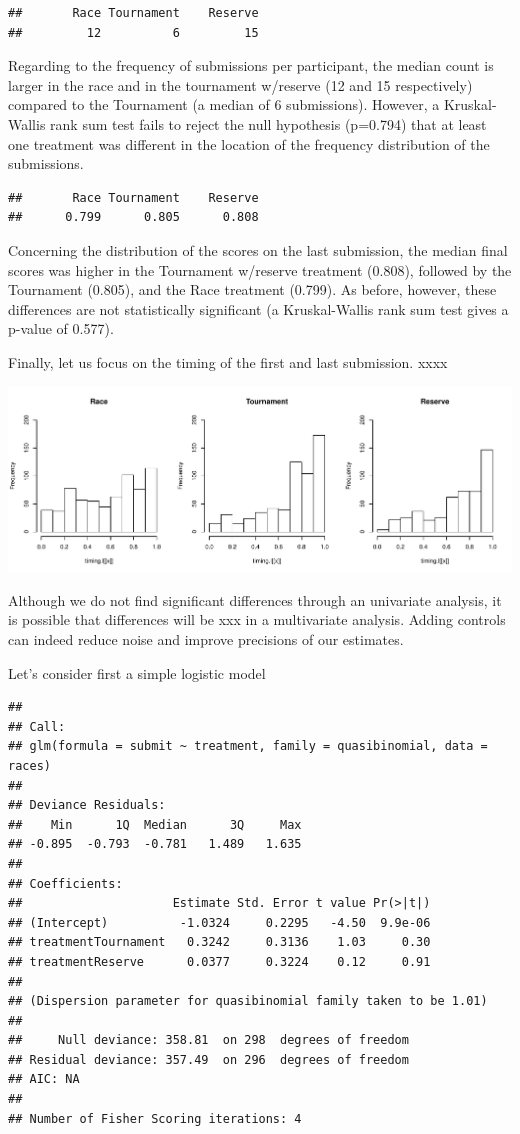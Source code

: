 \documentclass[12pt,]{article}
\begin{document}
\begin{verbatim}
##       Race Tournament    Reserve 
##         12          6         15
\end{verbatim}

Regarding to the frequency of submissions per participant, the median
count is larger in the race and in the tournament w/reserve (12 and 15
respectively) compared to the Tournament (a median of 6 submissions).
However, a Kruskal-Wallis rank sum test fails to reject the null
hypothesis (p=0.794) that at least one treatment was different in the
location of the frequency distribution of the submissions.

\begin{verbatim}
##       Race Tournament    Reserve 
##      0.799      0.805      0.808
\end{verbatim}

Concerning the distribution of the scores on the last submission, the
median final scores was higher in the Tournament w/reserve treatment
(0.808), followed by the Tournament (0.805), and the Race treatment
(0.799). As before, however, these differences are not statistically
significant (a Kruskal-Wallis rank sum test gives a p-value of 0.577).

Finally, let us focus on the timing of the first and last submission.
xxxx

\includegraphics{Figures/unnamed-chunk-16-1.pdf}

Although we do not find significant differences through an univariate
analysis, it is possible that differences will be xxx in a multivariate
analysis. Adding controls can indeed reduce noise and improve precisions
of our estimates.

Let's consider first a simple logistic model

\begin{verbatim}
## 
## Call:
## glm(formula = submit ~ treatment, family = quasibinomial, data = races)
## 
## Deviance Residuals: 
##    Min      1Q  Median      3Q     Max  
## -0.895  -0.793  -0.781   1.489   1.635  
## 
## Coefficients:
##                     Estimate Std. Error t value Pr(>|t|)
## (Intercept)          -1.0324     0.2295   -4.50  9.9e-06
## treatmentTournament   0.3242     0.3136    1.03     0.30
## treatmentReserve      0.0377     0.3224    0.12     0.91
## 
## (Dispersion parameter for quasibinomial family taken to be 1.01)
## 
##     Null deviance: 358.81  on 298  degrees of freedom
## Residual deviance: 357.49  on 296  degrees of freedom
## AIC: NA
## 
## Number of Fisher Scoring iterations: 4
\end{verbatim}
\end{document}
